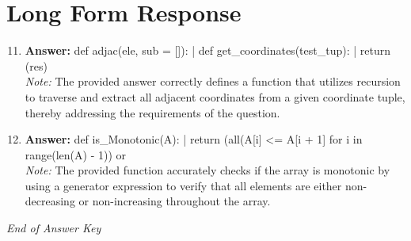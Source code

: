 \documentclass[12pt]{article}
\begin{document}
\section*{Long Form Response}
\begin{enumerate}[label=\arabic*.]
\setcounter{enumi}{10}
\item \textbf{Answer:} def adjac(ele, sub = []): | def get\_coordinates(test\_tup): | return (res)
\\ \textit{Note:} The provided answer correctly defines a function that utilizes recursion to traverse and extract all adjacent coordinates from a given coordinate tuple, thereby addressing the requirements of the question.
\item \textbf{Answer:} def is\_Monotonic(A): | return (all(A[i] \textless{}= A[i + 1] for i in range(len(A) - 1)) or
\\ \textit{Note:} The provided function accurately checks if the array is monotonic by using a generator expression to verify that all elements are either non-decreasing or non-increasing throughout the array.
\end{enumerate}

\vfill
\noindent\textit{End of Answer Key}
\end{document}
